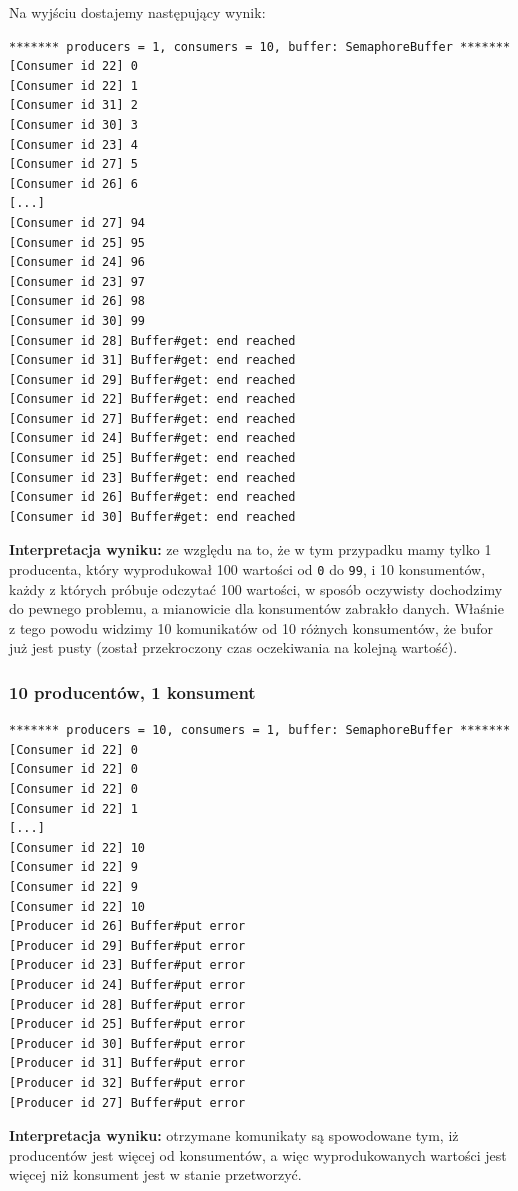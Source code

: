 \documentclass[11pt]{article}
\begin{document}
Na wyjściu dostajemy następujący wynik:

\begin{verbatim}
******* producers = 1, consumers = 10, buffer: SemaphoreBuffer *******
[Consumer id 22] 0
[Consumer id 22] 1
[Consumer id 31] 2
[Consumer id 30] 3
[Consumer id 23] 4
[Consumer id 27] 5
[Consumer id 26] 6
[...]
[Consumer id 27] 94
[Consumer id 25] 95
[Consumer id 24] 96
[Consumer id 23] 97
[Consumer id 26] 98
[Consumer id 30] 99
[Consumer id 28] Buffer#get: end reached
[Consumer id 31] Buffer#get: end reached
[Consumer id 29] Buffer#get: end reached
[Consumer id 22] Buffer#get: end reached
[Consumer id 27] Buffer#get: end reached
[Consumer id 24] Buffer#get: end reached
[Consumer id 25] Buffer#get: end reached
[Consumer id 23] Buffer#get: end reached
[Consumer id 26] Buffer#get: end reached
[Consumer id 30] Buffer#get: end reached
\end{verbatim}

\textbf{Interpretacja wyniku:} ze względu na to, że w tym przypadku mamy
tylko 1 producenta, który wyprodukował 100 wartości od \texttt{0} do
\texttt{99}, i 10 konsumentów, każdy z których próbuje odczytać 100
wartości, w sposób oczywisty dochodzimy do pewnego problemu, a
mianowicie dla konsumentów zabrakło danych. Właśnie z tego powodu
widzimy 10 komunikatów od 10 różnych konsumentów, że bufor już jest
pusty (został przekroczony czas oczekiwania na kolejną wartość).

\hypertarget{producentuxf3w-1-konsument}{%
\subsubsection{10 producentów, 1
konsument}\label{producentuxf3w-1-konsument}}

\begin{verbatim}
******* producers = 10, consumers = 1, buffer: SemaphoreBuffer *******
[Consumer id 22] 0
[Consumer id 22] 0
[Consumer id 22] 0
[Consumer id 22] 1
[...]
[Consumer id 22] 10
[Consumer id 22] 9
[Consumer id 22] 9
[Consumer id 22] 10
[Producer id 26] Buffer#put error
[Producer id 29] Buffer#put error
[Producer id 23] Buffer#put error
[Producer id 24] Buffer#put error
[Producer id 28] Buffer#put error
[Producer id 25] Buffer#put error
[Producer id 30] Buffer#put error
[Producer id 31] Buffer#put error
[Producer id 32] Buffer#put error
[Producer id 27] Buffer#put error
\end{verbatim}

\textbf{Interpretacja wyniku:} otrzymane komunikaty są spowodowane tym,
iż producentów jest więcej od konsumentów, a więc wyprodukowanych
wartości jest więcej niż konsument jest w stanie przetworzyć.
\end{document}
